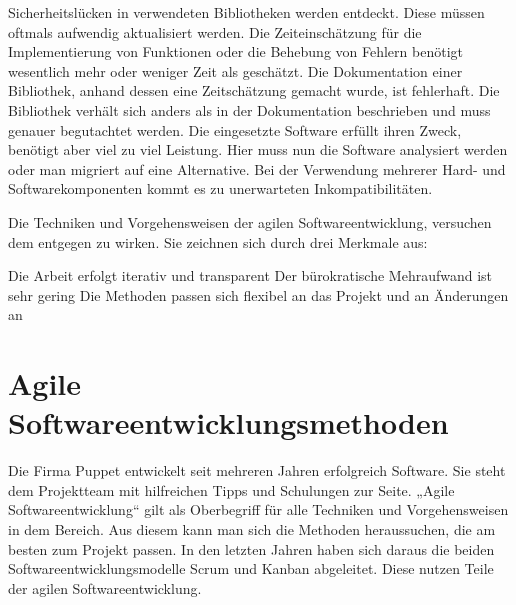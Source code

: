\begin{outline}
  \1 Sicherheitslücken in verwendeten Bibliotheken werden entdeckt. Diese
  müssen oftmals aufwendig aktualisiert werden.
  \1 Die Zeiteinschätzung für die Implementierung von Funktionen oder die
  Behebung von Fehlern benötigt wesentlich mehr oder weniger Zeit als
  geschätzt.
  \1 Die Dokumentation einer Bibliothek, anhand dessen eine Zeitschätzung
  gemacht wurde, ist fehlerhaft. Die Bibliothek verhält sich anders als in der
  Dokumentation beschrieben und muss genauer begutachtet werden.
  \1 Die eingesetzte Software erfüllt ihren Zweck, benötigt aber viel zu viel
  Leistung. Hier muss nun die Software analysiert werden oder man migriert auf
  eine Alternative.
  \1 Bei der Verwendung mehrerer Hard- und Softwarekomponenten kommt es zu
  unerwarteten Inkompatibilitäten.
\end{outline}

Die Techniken und Vorgehensweisen der agilen Softwareentwicklung, versuchen dem
entgegen zu wirken. Sie zeichnen sich durch drei Merkmale aus:

\begin{outline}
  \1 Die Arbeit erfolgt iterativ und transparent
  \1 Der bürokratische Mehraufwand ist sehr gering
  \1 Die Methoden passen sich flexibel an das Projekt und an Änderungen an
\end{outline}
\tm%

\section{Agile Softwareentwicklungsmethoden}
Die Firma Puppet entwickelt seit mehreren Jahren erfolgreich Software. Sie
steht dem Projektteam mit hilfreichen Tipps und Schulungen zur Seite. „Agile
Softwareentwicklung“ gilt als Oberbegriff für alle Techniken und
Vorgehensweisen in dem Bereich. Aus diesem kann man sich die Methoden
heraussuchen, die am besten zum Projekt passen. In den letzten Jahren haben
sich daraus die beiden Softwareentwicklungsmodelle Scrum und Kanban abgeleitet.
Diese nutzen Teile der agilen Softwareentwicklung.
\tm%

